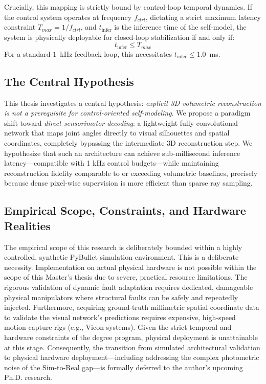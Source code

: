 \documentclass[12pt,a4paper,oneside]{report}
\begin{document}
Crucially, this mapping is strictly bound by control-loop temporal dynamics. If the control system operates at frequency $f_{ctrl}$, dictating a strict maximum latency constraint $T_{max} = 1/f_{ctrl}$, and $t_{\text{infer}}$ is the inference time of the self-model, the system is physically deployable for closed-loop stabilization if and only if:
\begin{equation}
t_{\text{infer}} \le T_{max}
\end{equation}
For a standard $1$~kHz feedback loop, this necessitates $t_{\text{infer}} \le 1.0$~ms.

\subsection{The Central Hypothesis}
\label{subsec:central_hypothesis_intro}

This thesis investigates a central hypothesis: \textit{explicit 3D volumetric reconstruction is not a prerequisite for control-oriented self-modeling}. We propose a paradigm shift toward \textit{direct sensorimotor decoding}: a lightweight fully convolutional network that maps joint angles directly to visual silhouettes and spatial coordinates, completely bypassing the intermediate 3D reconstruction step. We hypothesize that such an architecture can achieve sub-millisecond inference latency---compatible with 1 kHz control budgets---while maintaining reconstruction fidelity comparable to or exceeding volumetric baselines, precisely because dense pixel-wise supervision is more efficient than sparse ray sampling.

\subsection{Empirical Scope, Constraints, and Hardware Realities}
\label{subsec:empirical_scope_intro}

The empirical scope of this research is deliberately bounded within a highly controlled, synthetic PyBullet simulation environment. This is a deliberate necessity. Implementation on actual physical hardware is not possible within the scope of this Master's thesis due to severe, practical resource limitations. The rigorous validation of dynamic fault adaptation requires dedicated, damageable physical manipulators where structural faults can be safely and repeatedly injected. Furthermore, acquiring ground-truth millimetric spatial coordinate data to validate the visual network's predictions requires expensive, high-speed motion-capture rigs (e.g., Vicon systems). Given the strict temporal and hardware constraints of the degree program, physical deployment is unattainable at this stage. Consequently, the transition from simulated architectural validation to physical hardware deployment---including addressing the complex photometric noise of the Sim-to-Real gap---is formally deferred to the author's upcoming Ph.D. research.
\end{document}
